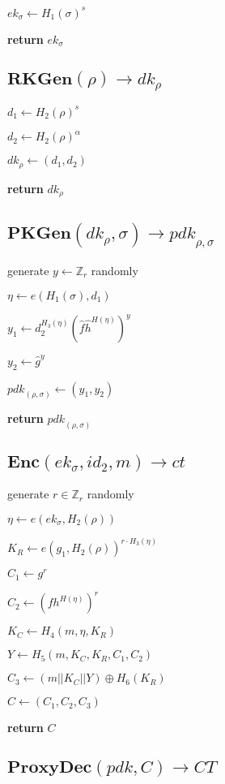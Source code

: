 \documentclass[a4paper]{article}
\begin{document}
$\textit{ek}_\sigma \gets H_1(\sigma)^s$

\textbf{return} $\textit{ek}_\sigma$

\subsection{$\textbf{RKGen}(\rho) \rightarrow \textit{dk}_\rho$}

$d_1 \gets H_2(\rho)^s$

$d_2 \gets H_2(\rho)^\alpha$

$\textit{dk}_\rho \gets (d_1, d_2)$

\textbf{return} $\textit{dk}_\rho$

\subsection{$\textbf{PKGen}(\textit{dk}_\rho, \sigma) \rightarrow \textit{pdk}_{\rho, \sigma}$}

generate $y \gets \mathbb{Z}_r$ randomly

$\eta \gets e(H_1(\sigma), d_1)$

$y_1 \gets d_2^{H_3(\eta)}(\hat{f}\hat{h}^{H(\eta)})^y$

$y_2 \gets \hat{g}^y$

$\textit{pdk}_{(\rho, \sigma)} \gets (y_1, y_2)$

\textbf{return} $\textit{pdk}_{(\rho, \sigma)}$

\subsection{$\textbf{Enc}(\textit{ek}_\sigma, \textit{id}_2, m) \rightarrow \textit{ct}$}

generate $r \in \mathbb{Z}_r$ randomly

$\eta \gets e(\textit{ek}_\sigma, H_2(\rho))$

$K_R \gets e(g_1, H_2(\rho))^{r \cdot H_3(\eta)}$

$C_1 \gets g^r$

$C_2 \gets (fh^{H(\eta)})^r$

$K_C \gets H_4(m, \eta, K_R)$

$Y \gets H_5(m, K_C, K_R, C_1, C_2)$

$C_3 \gets (m || K_C || Y) \oplus H_6(K_R)$

$C \gets (C_1, C_2, C_3)$

\textbf{return} $C$

\subsection{$\textbf{ProxyDec}(\textit{pdk}, C) \rightarrow \textit{CT}$}
\end{document}
